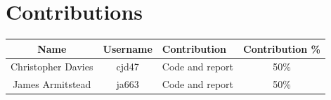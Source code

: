 \documentclass[11pt]{article}
\begin{document}
\begin{multicols}{2}
\setlength\abovedisplayskip{0pt}
\setlength\belowdisplayskip{0pt}
\begin{table}[H]
\begin{center}
\label{tbl:t3results}\caption{ACC Results and Runtime for Task 3.}
\end{center}
\end{table}
\vspace*{-\baselineskip}

\scriptsize

\normalsize
\end{multicols}

\newpage
{\color{indigo}
\section*{Contributions}}
\begin{table}[H]
\begin{tabular}{|c|c|p{8cm}|c|}
\hline
\textbf{Name} & \textbf{Username} & \textbf{Contribution} & \textbf{Contribution \%}\\
\hline
Christopher Davies & cjd47 & Code and report & 50\%\\
\hline
James Armitstead & ja663 & Code and report & 50\%\\
\hline
\end{tabular}
\end{table}
\end{document}
